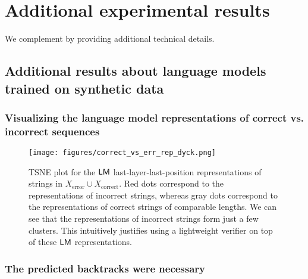 \clearpage
\section{Additional experimental results}
\label{sec:appendix:experiments}

We complement  by providing additional technical details.

\subsection{Additional results about language models trained on synthetic data}
\label{sec:appendix:experiments:synthetic}



\subsubsection{Visualizing the language model representations of correct vs. incorrect sequences}
\label{sec:experiments:synthetic:visualizing}



\begin{figure}[!h]
  \centering
  \begin{minipage}[b]{0.5\textwidth}  %
    \centering
    \texttt{[image: figures/correct\_vs\_err\_rep\_dyck.png]}  %
  \end{minipage}
  \caption{
  TSNE plot for the $\mathsf{LM}$ last-layer-last-position representations of strings in $X_{\text{error}} \cup X_{\text{correct}}$.
  Red dots correspond to the representations of incorrect strings, 
  whereas gray dots correspond to the representations of correct strings of comparable lengths.
  We can see that the representations of incorrect strings form just a few clusters.
  This intuitively justifies using a lightweight verifier on top of these $\mathsf{LM}$ representations. 
  }  
  \label{fig:correct_vs_err_rep_dyck}
\end{figure}





\clearpage
\subsubsection{The predicted backtracks were necessary}
\label{sec:experiments:synthetic:predicted_backtracks_were_necessary}

